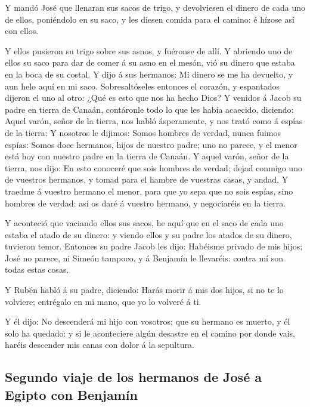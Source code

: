  Y mandó José que llenaran sus sacos de trigo, y
devolviesen el dinero de cada uno de ellos, poniéndolo en su saco, y les
diesen comida para el camino: é hízose así con ellos.

 Y ellos pusieron su trigo sobre sus asnos, y fuéronse de
allí.  Y abriendo uno de ellos su saco para dar de comer
á su asno en el mesón, vió su dinero que estaba en la boca de su costal.
 Y dijo á sus hermanos: Mi dinero se me ha devuelto, y
aun helo aquí en mi saco. Sobresaltóseles entonces el corazón, y
espantados dijeron el uno al otro: ¿Qué es esto que nos ha hecho Dios?
 Y venidos á Jacob su padre en tierra de Canaán,
contáronle todo lo que les había acaecido, diciendo: 
Aquel varón, señor de la tierra, nos habló ásperamente, y nos trató como
á espías de la tierra:  Y nosotros le dijimos: Somos
hombres de verdad, nunca fuimos espías:  Somos doce
hermanos, hijos de nuestro padre; uno no parece, y el menor está hoy con
nuestro padre en la tierra de Canaán.  Y aquel varón,
señor de la tierra, nos dijo: En esto conoceré que sois hombres de
verdad; dejad conmigo uno de vuestros hermanos, y tomad para el hambre
de vuestras casas, y andad,  Y traedme á vuestro hermano
el menor, para que yo sepa que no sois espías, sino hombres de verdad:
así os daré á vuestro hermano, y negociaréis en la tierra.

 Y aconteció que vaciando ellos sus sacos, he aquí que en
el saco de cada uno estaba el atado de su dinero: y viendo ellos y su
padre los atados de su dinero, tuvieron temor.  Entonces
su padre Jacob les dijo: Habéisme privado de mis hijos; José no parece,
ni Simeón tampoco, y á Benjamín le llevaréis: contra mí son todas estas
cosas.

 Y Rubén habló á su padre, diciendo: Harás morir á mis
dos hijos, si no te lo volviere; entrégalo en mi mano, que yo lo volveré
á ti.

 Y él dijo: No descenderá mi hijo con vosotros; que su
hermano es muerto, y él solo ha quedado: y si le aconteciere algún
desastre en el camino por donde vais, haréis descender mis canas con
dolor á la sepultura.

\hypertarget{segundo-viaje-de-los-hermanos-de-josuxe9-a-egipto-con-benjamuxedn}{%
\subsection{Segundo viaje de los hermanos de José a Egipto con
Benjamín}\label{segundo-viaje-de-los-hermanos-de-josuxe9-a-egipto-con-benjamuxedn}}

